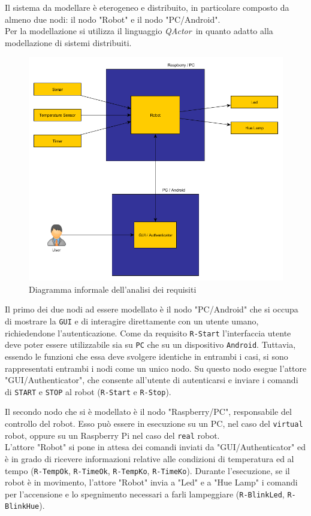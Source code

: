 \documentclass{llncs}
\newcommand{\action}[1]{\texttt{#1}\xspace}
\newcommand{\code}[1]{{\color{blue}\small{\texttt{#1}}}}
\newcommand{\fname}[1]{{\color{magenta}\small{\texttt{#1}}}}
\newcommand{\qa}{\textsf{\textit{QActor}}}
\begin{document}

Il sistema da modellare è eterogeneo e distribuito, in particolare composto da almeno due nodi: il nodo "Robot" e il nodo "PC/Android". \\
Per la modellazione si utilizza il linguaggio \qa\ in quanto adatto alla modellazione di sistemi distribuiti. 

\begin{figure}[h]
	\centering
	\includegraphics[scale=0.4]{img/requirements_analysis.png}
	\caption{Diagramma informale dell'analisi dei requisiti}
	\label{fig:reqAnalysis}
\end{figure}

Il primo dei due nodi ad essere modellato è il nodo "PC/Android" che si occupa di mostrare la \action{GUI} e di interagire direttamente con un utente umano, richiedendone l'autenticazione. Come da requisito \code{R-Start} l'interfaccia utente deve poter essere utilizzabile sia su \action{PC} che su un dispositivo \action{Android}. Tuttavia, essendo le funzioni che essa deve svolgere identiche in entrambi i casi, si sono rappresentati entrambi i nodi come un unico nodo. Su questo nodo esegue l'attore "GUI/Authenticator", che consente all'utente di autenticarsi e inviare i comandi di \action{START} e \action{STOP} al robot (\code{R-Start} e \code{R-Stop}). 

Il secondo nodo che si è modellato è il nodo "Raspberry/PC", responsabile del controllo del robot. Esso può essere in esecuzione su un PC, nel caso del \fname{virtual} robot, oppure su un Raspberry Pi nel caso del \fname{real} robot. \\ L'attore "Robot" si pone in attesa dei comandi inviati da "GUI/Authenticator" ed è in grado di ricevere informazioni relative alle condizioni di temperatura ed al tempo (\code{R-TempOk}, \code{R-TimeOk}, \code{R-TempKo}, \code{R-TimeKo}). Durante l'esecuzione, se il robot è in movimento, l'attore "Robot" invia a "Led" e a "Hue Lamp" i comandi per l'accensione e lo spegnimento necessari a farli lampeggiare (\code{R-BlinkLed}, \code{R-BlinkHue}). 
\end{document}
